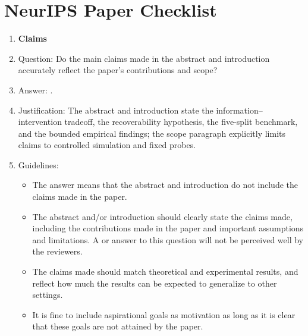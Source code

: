 \section*{NeurIPS Paper Checklist}

\begin{enumerate}

\item {\bf Claims}
    \item[] Question: Do the main claims made in the abstract and introduction accurately reflect the paper's contributions and scope?
    \item[] Answer: \answerYes{}.
    \item[] Justification: The abstract and introduction state the information--intervention tradeoff, the recoverability hypothesis, the five-split benchmark, and the bounded empirical findings; the scope paragraph explicitly limits claims to controlled simulation and fixed probes.
    \item[] Guidelines:
    \begin{itemize}
        \item The answer \answerNA{} means that the abstract and introduction do not include the claims made in the paper.
        \item The abstract and/or introduction should clearly state the claims made, including the contributions made in the paper and important assumptions and limitations. A \answerNo{} or \answerNA{} answer to this question will not be perceived well by the reviewers.
        \item The claims made should match theoretical and experimental results, and reflect how much the results can be expected to generalize to other settings.
        \item It is fine to include aspirational goals as motivation as long as it is clear that these goals are not attained by the paper.
    \end{itemize}


\end{enumerate}
